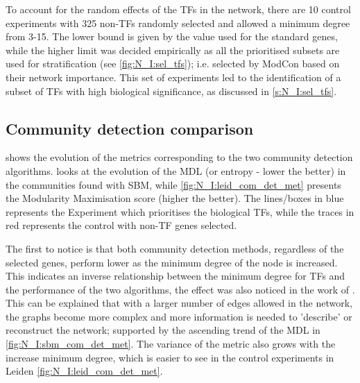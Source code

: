 To account for the random effects of the TFs in the network, there are 10 control experiments with 325 non-TFs randomly selected and allowed a minimum degree from 3-15. The lower bound is given by the value used for the standard genes, while the higher limit was decided empirically as all the prioritised subsets are used for stratification (see \cref{fig:N_I:sel_tfs}); i.e. selected by ModCon based on their network importance. This set of experiments led to the identification of a subset of TFs with high biological significance, as discussed in \cref{s:N_I:sel_tfs}.


\subsection{Community detection comparison}

 shows the evolution of the metrics corresponding to the two community detection algorithms.  looks at the evolution of the MDL (or entropy - lower the better) in the communities found with SBM, while \cref{fig:N_I:leid_com_det_met} presents the Modularity Maximisation score (higher the better). The lines/boxes in blue represents the Experiment which prioritises the biological TFs, while the traces in red represents the control with non-TF genes selected. 

The first to notice is that both community detection methods, regardless of the selected genes, perform lower as the minimum degree of the node is increased. This indicates an inverse relationship between the minimum degree for TFs and the performance of the two algorithms, the effect was also noticed in the work of \citet{Care2019-ij}. This can be explained that with a larger number of edges allowed in the network, the graphs become more complex and more information is needed to 'describe' or reconstruct the network; supported by the ascending trend of the MDL in \cref{fig:N_I:sbm_com_det_met}. The variance of the metric also grows with the increase minimum degree, which is easier to see in the control experiments in Leiden \cref{fig:N_I:leid_com_det_met}.



